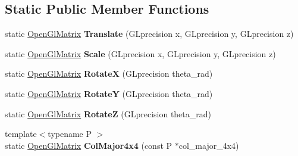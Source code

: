 \subsection*{Static Public Member Functions}
\begin{DoxyCompactItemize}
\item 
static \hyperlink{structpangolin_1_1_open_gl_matrix}{Open\+Gl\+Matrix} {\bfseries Translate} (G\+Lprecision x, G\+Lprecision y, G\+Lprecision z)\hypertarget{structpangolin_1_1_open_gl_matrix_ae017fce9e537593d2b09c0340313e829}{}\label{structpangolin_1_1_open_gl_matrix_ae017fce9e537593d2b09c0340313e829}

\item 
static \hyperlink{structpangolin_1_1_open_gl_matrix}{Open\+Gl\+Matrix} {\bfseries Scale} (G\+Lprecision x, G\+Lprecision y, G\+Lprecision z)\hypertarget{structpangolin_1_1_open_gl_matrix_a051479f6724f6335a58631743c4509a8}{}\label{structpangolin_1_1_open_gl_matrix_a051479f6724f6335a58631743c4509a8}

\item 
static \hyperlink{structpangolin_1_1_open_gl_matrix}{Open\+Gl\+Matrix} {\bfseries RotateX} (G\+Lprecision theta\+\_\+rad)\hypertarget{structpangolin_1_1_open_gl_matrix_a44a0a9c518623f98588c98496b6b1707}{}\label{structpangolin_1_1_open_gl_matrix_a44a0a9c518623f98588c98496b6b1707}

\item 
static \hyperlink{structpangolin_1_1_open_gl_matrix}{Open\+Gl\+Matrix} {\bfseries RotateY} (G\+Lprecision theta\+\_\+rad)\hypertarget{structpangolin_1_1_open_gl_matrix_add3c228151866d9fcd7acc7a10c30bc4}{}\label{structpangolin_1_1_open_gl_matrix_add3c228151866d9fcd7acc7a10c30bc4}

\item 
static \hyperlink{structpangolin_1_1_open_gl_matrix}{Open\+Gl\+Matrix} {\bfseries RotateZ} (G\+Lprecision theta\+\_\+rad)\hypertarget{structpangolin_1_1_open_gl_matrix_a71af7938cdd77aac099f7e429e8865f9}{}\label{structpangolin_1_1_open_gl_matrix_a71af7938cdd77aac099f7e429e8865f9}

\item 
{\footnotesize template$<$typename P $>$ }\\static \hyperlink{structpangolin_1_1_open_gl_matrix}{Open\+Gl\+Matrix} {\bfseries Col\+Major4x4} (const P $\ast$col\+\_\+major\+\_\+4x4)\hypertarget{structpangolin_1_1_open_gl_matrix_a4ba1ff2a3188442d0e43f30c075aae58}{}\label{structpangolin_1_1_open_gl_matrix_a4ba1ff2a3188442d0e43f30c075aae58}

\end{DoxyCompactItemize}
